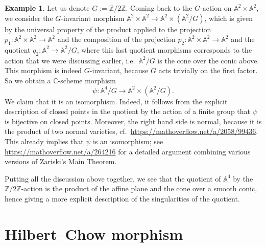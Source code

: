 \documentclass[12pt,a4paper]{amsart}
\theoremstyle{plain}
\theoremstyle{definition}
\newtheorem{exmp}[thm]{Example}
\theoremstyle{remark}
\begin{document}
\begin{exmp}
  Let us denote $G := \mathbb{Z}/2\mathbb{Z}$.
  Coming back to the $G$-action on $\mathbb{A}^{2} \times \mathbb{A}^{2}$, we consider the $G$-invariant morphism $\mathbb{A}^{2} \times \mathbb{A}^{2} \to \mathbb{A}^{2} \times (\mathbb{A}^{2}/G)$, which is given by the universal property of the product applied to the projection $p_{1} \colon \mathbb{A}^{2} \times \mathbb{A}^{2} \to \mathbb{A}^{2}$ and the composition of the projection $p_{2} \colon \mathbb{A}^{2} \times \mathbb{A}^{2} \to \mathbb{A}^{2}$ and the quotient $q_{2} \colon \mathbb{A}^{2} \to \mathbb{A}^{2}/G$, where this last quotient morphisms corresponds to the action that we were discussing earlier, i.e.~$\mathbb{A}^{2}/G$ is the cone over the conic above.
  This morphism is indeed $G$-invariant, because $G$ acts trivially on the first factor.
  So we obtain a $\mathbb{C}$-scheme morphism
  \[ \psi \colon \mathbb{A}^{4}/G \to \mathbb{A}^{2} \times (\mathbb{A}^{2}/G). \]
  We claim that it is an isomorphism.
  Indeed, it follows from the explicit description of closed points in the quotient by the action of a finite group that $\psi$ is bijective on closed points.
  Moreover, the right hand side is normal, because it is the product of two normal varieties, cf.~\url{https://mathoverflow.net/a/2058/99436}.
  This already implies that $\psi$ is an isomorphism; see \url{https://mathoverflow.net/a/264216} for a detailed argument combining various versions of Zariski's Main Theorem.

  Putting all the discussion above together, we see that the quotient of $\mathbb{A}^{4}$ by the $\mathbb{Z}/2\mathbb{Z}$-action is the product of the affine plane and the cone over a smooth conic, hence giving a more explicit description of the singularities of the quotient.
\end{exmp}

\section{Hilbert--Chow morphism}
\end{document}

